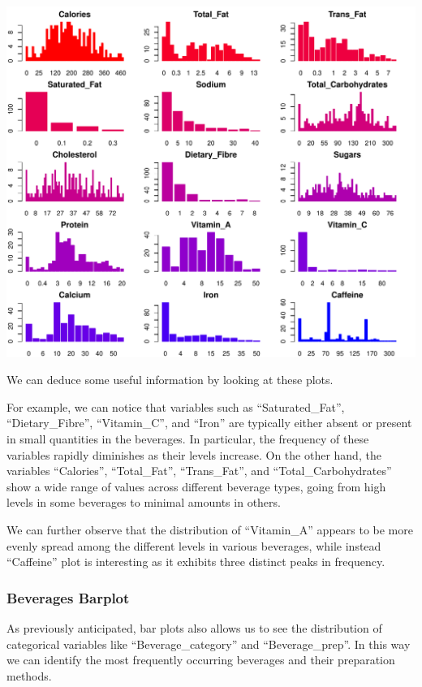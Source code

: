 \documentclass[
]{article}
\begin{document}
\begin{center}\includegraphics{Statistical_Learning_Final_Report_files/figure-latex/barplot-1} \end{center}

We can deduce some useful information by looking at these plots.

For example, we can notice that variables such as ``Saturated\_Fat'',
``Dietary\_Fibre'', ``Vitamin\_C'', and ``Iron'' are typically either
absent or present in small quantities in the beverages. In particular,
the frequency of these variables rapidly diminishes as their levels
increase. On the other hand, the variables ``Calories'', ``Total\_Fat'',
``Trans\_Fat'', and ``Total\_Carbohydrates'' show a wide range of values
across different beverage types, going from high levels in some
beverages to minimal amounts in others.

We can further observe that the distribution of ``Vitamin\_A'' appears
to be more evenly spread among the different levels in various
beverages, while instead ``Caffeine'' plot is interesting as it exhibits
three distinct peaks in frequency.

\hypertarget{beverages-barplot}{%
\subsubsection{Beverages Barplot}\label{beverages-barplot}}

As previously anticipated, bar plots also allows us to see the
distribution of categorical variables like ``Beverage\_category'' and
``Beverage\_prep''. In this way we can identify the most frequently
occurring beverages and their preparation methods.
\end{document}
